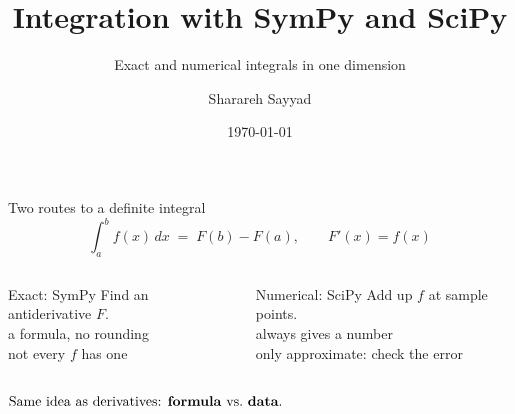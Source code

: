 \documentclass[aspectratio=169]{beamer}
\title{Integration with SymPy and SciPy}
\subtitle{Exact and numerical integrals in one dimension}
\author{Sharareh Sayyad}
\institute{Washington State University}
\date{\today}
\newcommand{\cbox}[2]{\colorbox{#1}{\ensuremath{\displaystyle #2}}}
\begin{document}
\frame{\titlepage}

\begin{frame}{Two routes to a definite integral}
\[ \int_a^b f(x)\,dx \;=\; F(b) - F(a), \qquad F'(x) = f(x) \]

\vspace{0.2em}
\begin{columns}[T]
\begin{column}{0.48\textwidth}
\begin{block}{Exact: SymPy}
\small
Find an antiderivative $F$.\\[2pt]
\footnotesize
\textcolor{gr}{} a formula, no rounding\\
\textcolor{hl}{} not every $f$ has one
\end{block}
\end{column}
\begin{column}{0.48\textwidth}
\begin{block}{Numerical: SciPy}
\small
Add up $f$ at sample points.\\[2pt]
\footnotesize
\textcolor{gr}{} always gives a number\\
\textcolor{hl}{} only approximate: check the error
\end{block}
\end{column}
\end{columns}

\vspace{0.8em}
\centering
\cbox{accent!12}{\text{Same idea as derivatives: \textbf{formula} vs.\ \textbf{data}.}}
\end{frame}
\end{document}
